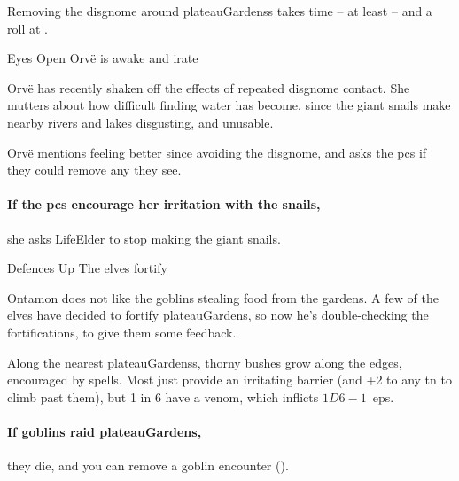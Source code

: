 \begin{multicols}{2}
Removing the \gls{disgnome} around \glspl{plateauGardens} takes time -- at least  -- and a  roll at \tn[10].

\setcounter{segNo}{-1}

{Eyes Open}%
{Orv\"e is awake and irate}%

Orv\"e has recently shaken off the effects of repeated \gls{disgnome} contact.
She mutters about how difficult finding water has become, since the giant snails make nearby rivers and lakes disgusting, and unusable.

Orv\"e mentions feeling better since avoiding the \gls{disgnome}, and asks the \glspl{pc} if they could remove any they see.


\paragraph{If the \glspl{pc} encourage her irritation with the snails,}
she asks \gls{LifeElder} to stop making the giant snails.


{Defences Up}%
{The elves fortify }%

Ontamon does not like the goblins stealing food from the gardens.
A few of the elves have decided to fortify \gls{plateauGardens}, so now he's double-checking the fortifications, to give them some feedback.

Along the nearest \glspl{plateauGardens}, thorny bushes grow along the edges, encouraged by \glspl{spell}.
Most just provide an irritating barrier (and +2 to any \gls{tn} to climb past them), but 1 in 6 have a venom, which inflicts $1D6-1$~\glspl{ep}.

\paragraph{If goblins raid \gls{plateauGardens},}
they die, and you can remove a goblin encounter ().

\label{ontamon}


\end{multicols}
